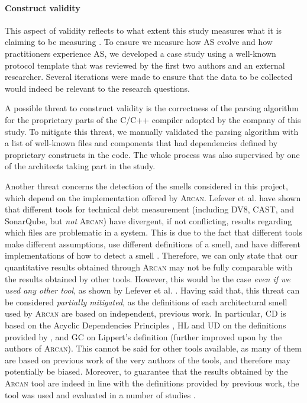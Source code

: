 \paragraph{Construct validity}
This aspect of validity reflects to what extent this study measures what it is claiming to be measuring \cite{Runeson2012}.
To ensure we measure how AS evolve and how practitioners experience AS, we developed a case study using a well-known protocol template \cite{Brereton2008} that was reviewed by the first two authors and an external researcher. Several iterations were made to ensure that the data to be collected would indeed be relevant to the research questions.

A possible threat to construct validity is the correctness of the parsing algorithm for the proprietary parts of the C/C++ compiler adopted by the company of this study. 
To mitigate this threat, we manually validated the parsing algorithm with a list of well-known files and components that had dependencies defined by proprietary constructs in the code.
The whole process was also supervised by one of the architects taking part in the study.

Another threat concerns the detection of the smells considered in this project, which depend on the implementation offered by \textsc{Arcan}.
Lefever et al. \cite{Lefever2021} have shown that different tools for technical debt measurement (including DV8, CAST, and SonarQube, but \emph{not} \textsc{Arcan}) have divergent, if not conflicting, results regarding which files are problematic in a system.
This is due to the fact that different tools make different assumptions, use different definitions of a smell, and have different implementations of how to detect a smell \cite{Lefever2021}.
Therefore, we can only state that our quantitative results obtained through \textsc{Arcan} may not be fully comparable with the results obtained by other tools.
However, this would be the case \emph{even if we used any other tool}, as shown by Lefever et al. \cite{Lefever2021}. 
Having said that, this threat can be considered \emph{partially mitigated}, as the definitions of each architectural smell used by \textsc{Arcan} are based on independent, previous work.
In particular, CD is based on the Acyclic Dependencies Principles \cite{Martin2018,Lippert2006}, HL and UD on the definitions provided by \cite{Samarthyam2016,Martin2018}, and GC on Lippert's definition \cite{Lippert2006} (further improved upon by the authors of \textsc{Arcan}).
This cannot be said for other tools available, as many of them are based on previous work of the very authors of the tools, and therefore may potentially be biased.
Moreover, to guarantee that the results obtained by the \textsc{Arcan} tool are indeed in line with the definitions provided by previous work, the tool was used and evaluated in a number of studies \cite{Arcelli2016,Biaggi2018,Sas2019}.

